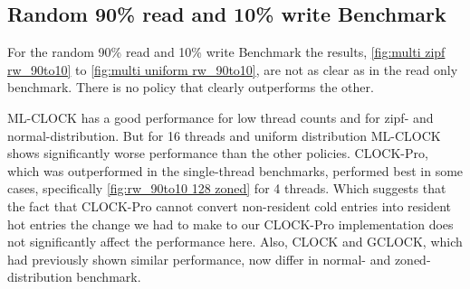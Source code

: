 \documentclass[
	12pt,
	a4paper,
	abstract,
	bibliography=totoc,
	chapterprefix,
	headings=openright,
	numbers=endperiod,
	parskip=half,
	twoside,
]{scrreprt}
\begin{document}
\subsection{Random 90\% read and 10\% write Benchmark}

For the random 90\% read and 10\% write Benchmark the results, 
\cref{fig:multi zipf rw_90to10} to \cref{fig:multi uniform rw_90to10}, 
are not as clear as in the read only benchmark.
There is no policy that clearly outperforms the other.

ML-CLOCK has a good performance for low thread counts and for zipf- and normal-distribution.
But for 16 threads and uniform distribution ML-CLOCK shows significantly worse performance than the other policies.
CLOCK-Pro, which was outperformed in the single-thread benchmarks, 
performed best in some cases, specifically \cref{fig:rw_90to10 128 zoned} for 4 threads.
Which suggests that the fact that CLOCK-Pro cannot convert non-resident cold entries into resident hot entries
the change we had to make to our CLOCK-Pro implementation does not significantly affect the performance here.
Also, CLOCK and GCLOCK, which had previously shown similar performance, 
now differ in normal- and zoned-distribution benchmark.
\end{document}
